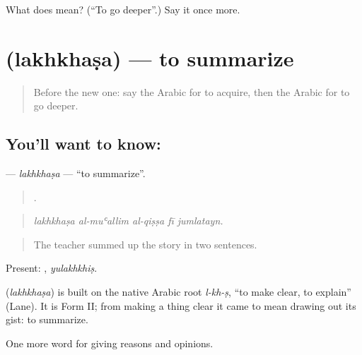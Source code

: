 \begin{tcolorbox}[breakable,colback=teal!4,colframe=teal!35!black,title={Before you move on}]
What does  mean? (\textquotedblleft{}To go deeper\textquotedblright{}.) Say it once more.
\end{tcolorbox}
\section[\texorpdfstring{\ar{لخص} (lakhkhaṣa)}{لخص (lakhkhaṣa)}]{ (lakhkhaṣa) — to summarize}

\label{lesson:AR-C394-lakhkhasa}



\begin{quote}
Before the new one: say the Arabic for to acquire, then the Arabic for to go deeper.
\end{quote}

\subsection*{You'll want to know: }
\textbf{} — \emph{lakhkhaṣa} — \textquotedblleft{}to summarize\textquotedblright{}.

\begin{quote}
    .
\end{quote}

\begin{quote}
\emph{lakhkhaṣa al-muʿallim al-qiṣṣa fī jumlatayn.}
\end{quote}

\begin{quote}
The teacher summed up the story in two sentences.
\end{quote}

Present: , \emph{yulakhkhiṣ}.

\begin{cousinweb}
\textbf{} (\emph{lakhkhaṣa}) is built on the native Arabic root \emph{l-kh-ṣ}, \textquotedblleft{}to make clear, to explain\textquotedblright{} (Lane). It is Form II; from making a thing clear it came to mean drawing out its gist: to summarize.
\end{cousinweb}

\begin{grammarlens}[title={What you've built}]
One more word for giving reasons and opinions.
\end{grammarlens}

